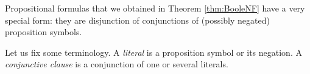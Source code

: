 

\setcounter{section}{1}
\setcounter{subsection}{5}
\setcounter{dfn}{15}

Propositional formulas that we obtained in Theorem \ref{thm:BooleNF} have a very special form:
they are disjunction of conjunctions of (possibly negated) proposition symbols.

Let us fix some terminology.
A \emph{literal} is a proposition symbol or its negation.
A \emph{conjunctive clause} is a conjunction of one or several literals.



